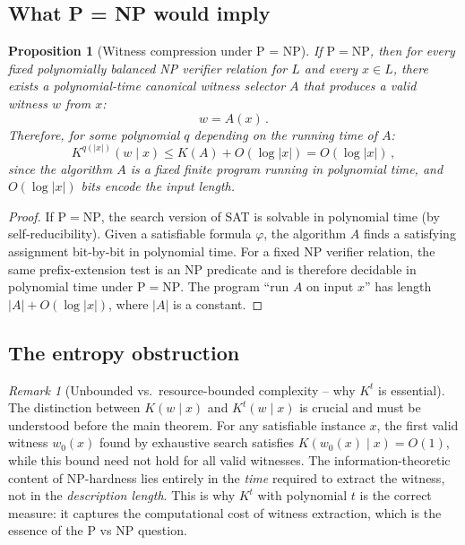 \documentclass[aps,prd,twocolumn,superscriptaddress,nofootinbib]{revtex4-2}
\newtheorem{proposition}[theorem]{Proposition}
\theoremstyle{definition}
\theoremstyle{remark}
\newtheorem{remark}[theorem]{Remark}
\newcommand{\NP}{\mathrm{NP}}
\newcommand{\PP}{\mathrm{P}}
\begin{document}
\subsection{What P = NP would imply}

\begin{proposition}[Witness compression under P = NP]
\label{prop:compression}
If $\PP = \NP$, then for every fixed polynomially balanced NP verifier relation for $L$ and every $x \in L$, there exists a polynomial-time canonical witness selector $A$ that produces a valid witness $w$ from $x$:
\begin{equation}
w = A(x)\,.
\end{equation}
Therefore, for some polynomial $q$ depending on the running time of $A$:
\begin{equation}
K^{q(|x|)}(w \mid x) \leq K(A) + O(\log|x|) = O(\log|x|)\,,
\label{eq:compression}
\end{equation}
since the algorithm $A$ is a fixed finite program running in polynomial time, and $O(\log|x|)$ bits encode the input length.
\end{proposition}

\begin{proof}
If $\PP = \NP$, the search version of SAT is solvable in polynomial time (by self-reducibility). Given a satisfiable formula $\varphi$, the algorithm $A$ finds a satisfying assignment bit-by-bit in polynomial time. For a fixed NP verifier relation, the same prefix-extension test is an NP predicate and is therefore decidable in polynomial time under $\PP=\NP$. The program ``run $A$ on input $x$'' has length $|A| + O(\log|x|)$, where $|A|$ is a constant.
\end{proof}

\subsection{The entropy obstruction}

\begin{remark}[Unbounded vs.\ resource-bounded complexity -- why $K^t$ is essential]
\label{rem:bounded-vs-unbounded}
The distinction between $K(w \mid x)$ and $K^t(w \mid x)$ is crucial and must be understood before the main theorem. For any satisfiable instance $x$, the first valid witness $w_0(x)$ found
by exhaustive search satisfies $K(w_0(x)\mid x)=O(1)$, while this bound
need not hold for all valid witnesses. The information-theoretic content of NP-hardness lies entirely in the \textit{time} required to extract the witness, not in the \textit{description length}. This is why $K^t$ with polynomial $t$ is the correct measure: it captures the computational cost of witness extraction, which is the essence of the $\PP$ vs $\NP$ question.
\end{remark}
\end{document}
